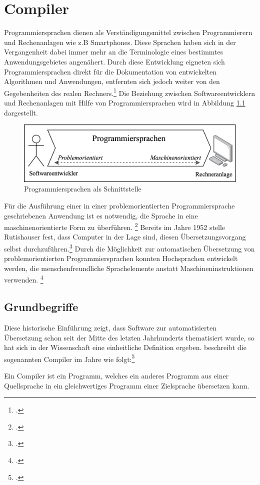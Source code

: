 \chapter{Compiler}
\label{chap:Compiler}

Programmiersprachen dienen als Verständigungsmittel zwischen Programmierern und Rechenanlagen wie z.B Smartphones.  Diese Sprachen haben sich in der Vergangenheit dabei immer mehr an die  Terminologie eines bestimmtes Anwendungsgebietes angenähert. Durch diese Entwicklung eigneten sich Programmiersprachen direkt für die Dokumentation von entwickelten Algorithmen und Anwendungen, entfernten sich jedoch weiter von den Gegebenheiten des realen Rechners.\footcite[Vgl.][S. 15]{Schneider1975} Die Beziehung zwischen Softwareentwicklern und Rechenanlagen mit Hilfe von Programmiersprachen wird in Abbildung \ref{fig:Programmiersprachen als Schnittstelle} dargestellt. 

\begin{figure}[!ht]
 \includegraphics[width=\textwidth,height=\textheight,keepaspectratio]{Images/LanguageIntermediary.png}
 \caption{Programmiersprachen als Schnittstelle}
 \label{fig:Programmiersprachen als Schnittstelle}
\end{figure}

Für die Ausführung einer in einer problemorientierten Programmiersprache geschriebenen Anwendung ist es notwendig, die Sprache in eine maschinenorientierte Form zu überführen. \footcite[Vgl.][S. 15]{Schneider1975} Bereits im Jahre 1952 stelle Rutishauser fest,  dass Computer in der Lage sind,  diesen Übersetzungsvorgang selbst durchzuführen.\footcite[Vgl.][S. 312]{Rutishauser1952} 
Durch die Möglichkeit zur automatischen Übersetzung von problemorientierten Programmiersprachen konnten Hochsprachen entwickelt werden, die menschenfreundliche Sprachelemente anstatt Maschineninstruktionen verwenden. \footcite[Vgl.][S. 47]{Wagenknecht2014}
\section{ Grundbegriffe}
Diese historische Einführung zeigt,  dass Software zur automatisierten Übersetzung schon seit der Mitte des letzten Jahrhunderts thematisiert wurde, so hat sich in der Wissenschaft eine einheitliche Definition ergeben.  \citeauthor{Ullmann2008} beschreibt die sogenannten Compiler im Jahre \citeyear{Ullmann2008} wie folgt:\footcite[Vgl.][S. 1]{Ullmann2008} 
\begin{Def}[Compiler]
Ein Compiler ist ein Programm, welches ein anderes Programm aus einer Quellsprache in ein gleichwertiges Programm einer Zielsprache übersetzen kann.
\end{Def} 
\vspace{-1em}

